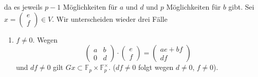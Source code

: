 \documentclass{article}
\begin{document}
\begin{enumerate}[(a)]
          da es jeweils $p-1$ Möglichkeiten für $a$ und $d$ und $p$ Möglichkeiten für $b$ gibt.
          Sei $x = \begin{pmatrix}
                  e \\f
              \end{pmatrix} \in V$. Wir unterscheiden wieder drei Fälle
          \begin{enumerate}[(1)]
              \item $f \neq 0$.
                    Wegen
                    \[
                        \begin{pmatrix}
                            a & b \\
                            0 & d
                        \end{pmatrix} \cdot \begin{pmatrix}
                            e \\f
                        \end{pmatrix} = \begin{pmatrix}
                            ae + bf \\df
                        \end{pmatrix}
                    \]
                    und $df \neq 0$ gilt $Gx \subset \mathbb{F}_p \times \mathbb{F}_p^\times$. ($df \neq 0$ folgt wegen $d \neq 0$, $f\neq 0$).


\end{enumerate}
\end{enumerate}
\end{document}
